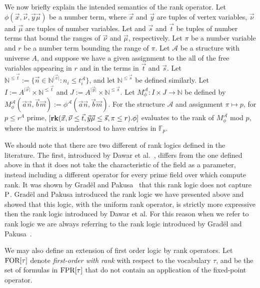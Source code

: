 \documentclass[../paper.tex]{subfiles}
\begin{document}
We now briefly explain the intended semantics of the rank operator. Let $\phi
(\vec{x}, \vec {\nu}, \vec{y}\vec{\mu})$ be a number term, where $\vec{x}$ and
$\vec{y}$ are tuples of vertex variables, $\vec{\nu}$ and $\vec{\mu}$ are tuples
of number variables. Let and $\vec{s}$ and $\vec{t}$ be tuples of number terms
that bound the ranges of $\vec{\nu}$ and $\vec{\mu}$, respectively. Let $\pi$ be
a number variable and $r$ be a number term bounding the range of $\pi$. Let
$\mathcal{A}$ be a structure with universe $A$, and suppose we have a given
assignment to the all of the free variables appearing in $r$ and in the terms in
$\vec{t}$ and $\vec{s}$. Let $\mathbb{N}^{\leq\vec{t}} := \{\vec{n} \in
\mathbb{N}^{\vert \vec{v} \vert}: n_i \leq t^{\mathcal{A}}_i\}$, and let
$\mathbb{N}^{\leq \vec{s}}$ be defined similarly. Let $I:= A^{\vert \vec{x}
  \vert} \times \mathbb{N}^{\leq \vec{t}}$ and $J := A^{\vert \vec{y} \vert}
\times \mathbb{N}^{\leq \vec{s}}$. Let $M^{\mathcal{A}}_\phi : I \times J
\rightarrow \mathbb{N}$ be defined by $M^{\mathcal{A}}_\phi (\vec{a}\vec{n},
\vec{b}\vec{m}):= \phi^{\mathcal{A}}(\vec{a}\vec{n},\vec{b}\vec{m})$. For the
structure $\mathcal{A}$ and assignment $\pi \mapsto p$, for $p \leq r^{A}$ prime,
$[\text{\textbf{rk}} (\vec{x}, \vec {\nu} \leq \vec{t}, \vec{y}\vec{\mu} \leq \vec{s}, \pi
\leq r). \phi]$ evaluates to the rank of $M^{\mathcal{A}}_\phi$ mod $p$, where
the matrix is understood to have entries in $\mathbb{F}_p$.

We should note that there are two different of rank logics defined in the
literature. The first, introduced by Dawar et al.~\cite{Dawar09logicswith},
differs from the one defined above in that it does not take the characteristic
of the field as a parameter, instead including a different operator for every
prime field over which compute rank. It was shown by Grad{\"e}l and
Pakusa~\cite{GradelP15a} that this rank logic does not capture $\mathrm{P}$. Grad{\"e}l
and Pakusa introduced the rank logic we have presented above and showed that
this logic, with the uniform rank operator, is strictly more expressive then the
rank logic introduced by Dawar et al. For this reason when we refer to rank
logic we are always referring to the rank logic introduced by Grad{\"e}l and
Pakusa~\cite{GradelP15a}.

We may also define an extension of first order logic by rank operators. Let
$\text{\upshape FOR}[\tau]$ denote \emph{first-order with rank} with respect to the vocabulary
$\tau$, and be the set of formulas in $\text{\upshape FPR}[\tau]$ that do not contain an
application of the fixed-point operator.
\end{document}
